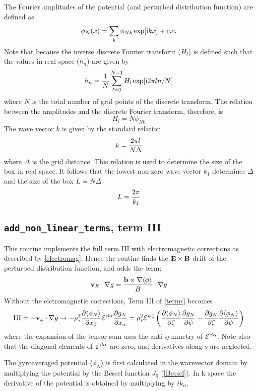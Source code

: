 \documentclass{report}
\def\be{\begin{equation}}
\def\ee{\end{equation}}
\begin{document}
The Fourier amplitudes of the potential (and perturbed distribution function) are defined as 
\be 
\phi_N(x) = \sum_k \phi_{Nk} \exp [ {\rm i} k x ] + c.c.  
\ee 
Note that because the inverse discrete Fourier transform ($H_l$) is defined such that 
the values in real space ($h_n$) are given by  
\be 
h_n = {1\over N} \sum_{l=0}^{N-1} H_l \exp [ {\rm i} 2\pi l n / N ] 
\ee 
where $N$ is the total number of grid points of the discrete transform. The relation between the 
amplitudes and the discrete Fourier transform, therefore, is 
\be 
H_l = N\phi_{Nk}
\ee 
The wave vector $k$ is given by the standard relation  
\be 
k = {2 \pi l \over N \Delta} 
\ee 
where $\Delta$ is the grid distance. This relation is used to determine the size of the box 
in real space. It follows that the lowest non-zero wave vector $k_1$ determines $\Delta$ and
the size of the box $L = N\Delta$ 
\be 
L = {2\pi \over k_1} 
\ee 

\subsection{\texttt{add\_non\_linear\_terms}, term III} 
This routine implements the full term III with electromagnetic corrections as described by \ref{electromag}.  Hence the routine finds the ${\bf E} \times {\bf B}$ drift of the perturbed distribution function, and adds the term:
\be 
\label{Edrift}
{\bf v}_E \cdot \nabla g = {{\bf b} \times \nabla \langle \phi \rangle \over B} \cdot \nabla g
\ee
Without the elctromagnetic corrections, Term III of \ref{terms} becomes
\be
\label{nl_term}
{\rm III} = - {\bf v}_\phi \cdot \nabla g \rightarrow - \rho_*^2 {\partial {\langle \phi_N \rangle} \over \partial x_\beta}
{\cal E}^{\beta \alpha} {\partial g_N \over \partial x_\alpha} = {\rho_*^2 {\cal E}^{\psi \zeta}}\left({{\partial {\langle \phi_{N} \rangle} \over \partial \zeta} {\partial g_N \over \partial \psi} - {\partial g_N \over \partial \zeta}{\partial {\langle \phi_{N} \rangle} \over \partial \psi}}\right)
\ee
where the expansion of the tensor sum uses the anti-symmetry of ${\cal E}^{\beta \alpha}$.  Note also that the diagonal elements of ${\cal E}^{\beta \alpha}$ are zero, and derivatives along $s$ are neglected. 

The gyroaveraged potential $\langle \phi_N \rangle$ is first calculated in the wavevector domain by multiplying the potential by the Bessel function $J_0$ (\ref {Bessel}). In k space the derivative of the potential is obtained by multiplying by $ik_\alpha$. 
\end{document}
